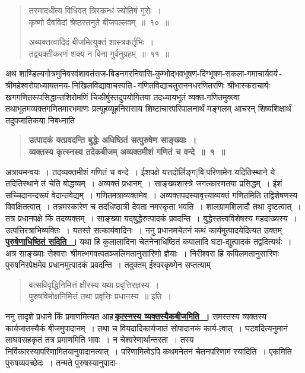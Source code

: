\documentclass[11pt, openany]{book}
\makeatletter
\newcommand{\devanagarinumeral}[1]{%
	\devanagaridigits{\number \csname c@#1\endcsname}} %
\makeatother
\begin{document}
\newpage
\renewcommand{\thepage}{\devanagarinumeral{page}}
\setcounter{page}{2}

\begin{quote}
{\small {\color{violet}तस्मादधीत्य विधिवत् त्रिस्कन्धं ज्योतिषं गुरोः~।\\
कृष्णो दैवविदां श्रेष्ठस्तनुते बीजपल्लवम्~॥~१०~॥}
\vspace{1mm}

{\color{violet}अव्यक्तत्वादिदं बीजमित्युक्तं शास्त्रकर्तृभिः~।\\
तद्व्यक्तीकरणं शक्यं न विना गुर्वनुग्रहम्~॥~११~॥}}
\end{quote}

\begin{sloppypar}
{\small अथ शाण्डिल्यगोत्रमुनिवरवंशावतंसज-बिडनगरनिवासि-कुम्भोद्भवभूषण-दिग्भूषण-सकला-गमाचार्यवर्य\,-\,श्रीमहेश्वरोपाध्यायतनय-\,निखिलविद्यावाचस्पति\,-\,गणितविद्याचतुराननधरणितरणिः श्रीभास्कराचार्यः खगगणितरूपसिद्धान्तशिरोमणिं चिकीर्षुस्तदुपयोगितया तदध्यायभूतं व्यक्त-गणितमुक्त्वा तथाभूतमव्यक्तगणितमारभमाणः प्रत्यूहव्यूहनिरासाय शिष्टाचारपरिपालनार्थं मङ्गलम् आचरन् शिष्यशिक्षार्थं तदुपजातिकया निबध्नाति\textendash }

 \label{1.1}
\begin{quote}
{\large \textbf{{\color{purple}उत्पादकं यत्प्रवदन्ति बुद्धेः अधिष्ठितं सत्पुरुषेण साङ्ख्याः~।\\
व्यक्तस्य कृत्स्नस्य तदेकबीजम् अव्यक्तमीशं गणितं च वन्दे~॥~१~॥}}}
\end{quote}

अत्रायमन्वयः~। तदव्यक्तमीशं गणितं च वन्दे~। ईशपक्षे यत्तदोर्लिङ्ग[वि]परिणामेन यदितिस्थाने ये तदितिस्थाने तं चेति बोद्धव्यम्~। अव्यक्तं प्रधानम्~। साङ्ख्यशास्त्रे जगत्कारणतया प्रसिद्धम्~। ईशं सच्चिदानन्दरूपं वेदान्तवेद्यम्~। गणितमत्राव्यक्तमेव~। अव्यक्तपदस्यावृत्त्याव्यक्तं गणितमिति तद्विशेषणस्य विवक्षितत्वात्~। तन्नमस्कारेण च तदधिष्ठात्री देवता नमस्कृता भवति~। शालग्रामशिलादौ तथा दृष्टत्वात्~। तत्र प्रधानपक्षे किं तदव्यक्तम्~। साङ्ख्या यद्बुद्धेरुत्पादकं प्रवदन्ति~। बुद्धेस्तत्त्वविशेषस्य महदाख्यस्य~। उत्पत्तिरत्राभिव्यक्तिः~। यतस्ते सत्कार्यवादिनः~। ननु प्रधानमचेतनं कथं कार्यमुत्पादयेदित्यत उक्तम्\textendash \,\hyperref[1.1]{\textbf{पुरुषेणाधिष्ठितं सदिति~।}} यथा हि कुलालादिना चेतनेनाधिष्ठितं कपालादि घटा-द्युत्पादकं तद्वदित्यर्थः~। अत्र साङ्ख्याः सेश्वराः श्रीमत्भगवत्पतञ्जलिमतानुसारिणो ज्ञेयाः~। निरीश्वरा हि कपिलमतानुसारिणः पुरुषनिरपेक्षमेव प्रधानमुत्पादकं प्रवदन्ति~। तदुक्तम् {\color{violet}ईश्वरकृष्णेन सप्तत्याम्\textendash }

\begin{quote}
{\color{violet}वत्सविवृद्धिनिमित्तं क्षीरस्य यथा प्रवृत्तिरज्ञस्य~।\\
पुरुषविमोक्षनिमित्तं तथा प्रवृत्तिः प्रधानस्य~॥} इति~।
\end{quote}

ननु तादृशे प्रधाने किं प्रमाणमित्यत आह\textendash \,\hyperref[1.1]{\textbf{कृत्स्नस्य व्यक्तस्यैकबीजमिति~।}} समस्तस्य व्यक्तस्य कार्यजातस्यैकं बीजमुपादानम्~। तथा च वियदादिकार्यजातं सोपादानकं कार्य-त्वात्~। घटवदित्यनुमानं लाघवसहकृतं तत्र प्रमाणमिति भावः~। न चेश्वरेणार्थान्तरता~। तस्य निर्विकारस्यापरिणामितयानुपादानत्वात्~। परिणामित्वेऽपि कथमनेतनं चेतनपरिणामं स्यादिति~। एकमिति पुरुषव्यवच्छेदः~। तन्मते पुरुषस्यानुपादा-
\end{sloppypar}
\end{document}
